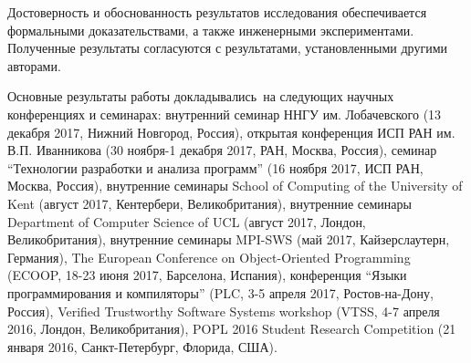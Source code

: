 
    
    

{\reliability}
Достоверность и обоснованность результатов исследования
обеспечивается формальными доказательствами, а также инженерными экспериментами.
Полученные результаты согласуются с результатами, установленными другими авторами.

Основные результаты работы докладывались~на следующих научных конференциях и семинарах:
внутренний семинар ННГУ им. Лобачевского (13 декабря 2017, Нижний Новгород, Россия),
открытая конференция ИСП РАН им. В.П. Иванникова (30 ноября-1 декабря  2017, РАН, Москва, Россия),
семинар ``Технологии разработки и анализа программ'' (16 ноября 2017, ИСП РАН, Москва, Россия),
внутренние семинары School of Computing of the University of Kent (август 2017, Кентербери, Великобритания),
внутренние семинары Department of Computer Science of UCL (август 2017, Лондон, Великобритания),
внутренние семинары MPI-SWS (май 2017, Кайзерслаутерн, Германия),
The European Conference on Object-Oriented Programming (ECOOP, 18-23 июня 2017, Барселона, Испания),
конференция ``Языки программирования и компиляторы'' (PLC, 3-5 апреля 2017, Ростов-на-Дону, Россия),
Verified Trustworthy Software Systems workshop (VTSS, 4-7 апреля 2016, Лондон, Великобритания),
POPL 2016 Student Research Competition (21 января 2016, Санкт-Петербург, Флорида, США).


